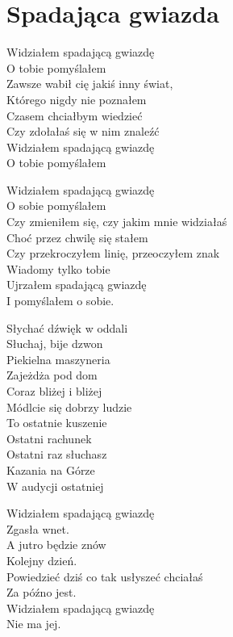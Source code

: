 \section{Spadająca gwiazda}
\begin{text}
Widziałem spadającą gwiazdę\\
O tobie pomyślałem\\
Zawsze wabił cię jakiś inny świat,\\
Którego nigdy nie poznałem\\
Czasem chciałbym wiedzieć\\
Czy zdołałaś się w nim znaleźć\\
Widziałem spadającą gwiazdę\\
O tobie pomyślałem

Widziałem spadającą gwiazdę\\
O sobie pomyślałem\\
Czy zmieniłem się, czy jakim mnie widziałaś\\
Choć przez chwilę się stałem\\
Czy przekroczyłem linię, przeoczyłem znak\\
Wiadomy tylko tobie\\
Ujrzałem spadającą gwiazdę\\
I pomyślałem o sobie.

Słychać dźwięk w oddali\\
Słuchaj, bije dzwon\\
Piekielna maszyneria\\
Zajeżdża pod dom\\
Coraz bliżej i bliżej\\
Módlcie się dobrzy ludzie\\
To ostatnie kuszenie\\
Ostatni rachunek\\
Ostatni raz słuchasz\\
Kazania na Górze\\
W audycji ostatniej

Widziałem spadającą gwiazdę\\
Zgasła wnet.\\
A jutro będzie znów\\
Kolejny dzień.\\
Powiedzieć dziś co tak usłyszeć chciałaś\\
Za późno jest.\\
Widziałem spadającą gwiazdę\\
Nie ma jej.\\
\end{text}
